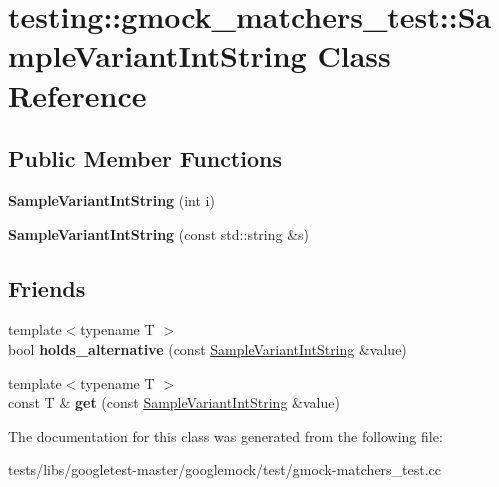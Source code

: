 \hypertarget{classtesting_1_1gmock__matchers__test_1_1SampleVariantIntString}{}\section{testing\+:\+:gmock\+\_\+matchers\+\_\+test\+:\+:Sample\+Variant\+Int\+String Class Reference}
\label{classtesting_1_1gmock__matchers__test_1_1SampleVariantIntString}
\subsection*{Public Member Functions}
\begin{DoxyCompactItemize}
\item 
\mbox{\label{classtesting_1_1gmock__matchers__test_1_1SampleVariantIntString_a362f135d65f8dd024202cc4908b510e2}} 
{\bfseries Sample\+Variant\+Int\+String} (int i)
\item 
\mbox{\label{classtesting_1_1gmock__matchers__test_1_1SampleVariantIntString_a2cca84a8b8af0726efab2b28df5e2880}} 
{\bfseries Sample\+Variant\+Int\+String} (const std\+::string \&s)
\end{DoxyCompactItemize}
\subsection*{Friends}
\begin{DoxyCompactItemize}
\item 
\mbox{\label{classtesting_1_1gmock__matchers__test_1_1SampleVariantIntString_a3139754402f0352ddea2ba7823ad16f1}} 
{\footnotesize template$<$typename T $>$ }\\bool {\bfseries holds\+\_\+alternative} (const \hyperlink{classtesting_1_1gmock__matchers__test_1_1SampleVariantIntString}{Sample\+Variant\+Int\+String} \&value)
\item 
\mbox{\label{classtesting_1_1gmock__matchers__test_1_1SampleVariantIntString_a492b2fd643a25c4345f56c68369ebd54}} 
{\footnotesize template$<$typename T $>$ }\\const T \& {\bfseries get} (const \hyperlink{classtesting_1_1gmock__matchers__test_1_1SampleVariantIntString}{Sample\+Variant\+Int\+String} \&value)
\end{DoxyCompactItemize}


The documentation for this class was generated from the following file\+:\begin{DoxyCompactItemize}
\item 
tests/libs/googletest-\/master/googlemock/test/gmock-\/matchers\+\_\+test.\+cc\end{DoxyCompactItemize}
